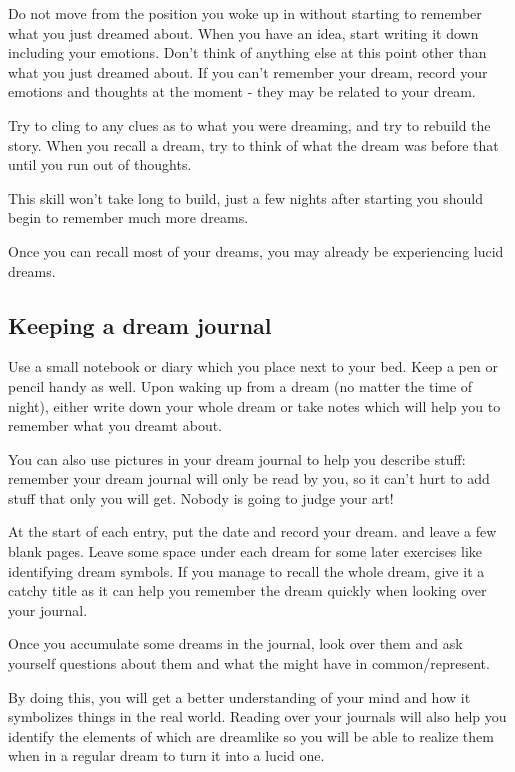\documentclass{book}
\begin{document}
Do not move from the position you woke up in without starting to remember what you just dreamed about. When you have an idea, start writing it down including your emotions. Don't think of anything else at this point other than what you just dreamed about. If you can't remember your dream, record your emotions and thoughts at the moment - they may be related to your dream.

Try to cling to any clues as to what you were dreaming, and try to rebuild the story. When you recall a dream, try to think of what the dream was before that until you run out of thoughts.

This skill won't take long to build, just a few nights after starting you should begin to remember much more dreams.

Once you can recall most of your dreams, you may already be experiencing lucid dreams.

\subsection{Keeping a dream journal}
Use a small notebook or diary which you place next to your bed. Keep a pen or pencil handy as well. Upon waking up from a dream (no matter the time of night), either write down your whole dream or take notes which will help you to remember what you dreamt about.

You can also use pictures in your dream journal to help you describe stuff: remember your dream journal will only be read by you, so it can't hurt to add stuff that only you will get. Nobody is going to judge your art!

At the start of each entry, put the date and record your dream. and leave a few blank pages. Leave some space under each dream for some later exercises like identifying dream symbols. If you manage to recall the whole dream, give it a catchy title as it can help you remember the dream quickly when looking over your journal.

Once you accumulate some dreams in the journal, look over them and ask yourself questions about them and what the might have in common/represent.

By doing this, you will get a better understanding of your mind and how it symbolizes things in the real world. Reading over your journals will also help you identify the elements of which are dreamlike so you will be able to realize them when in a regular dream to turn it into a lucid one.
\end{document}

